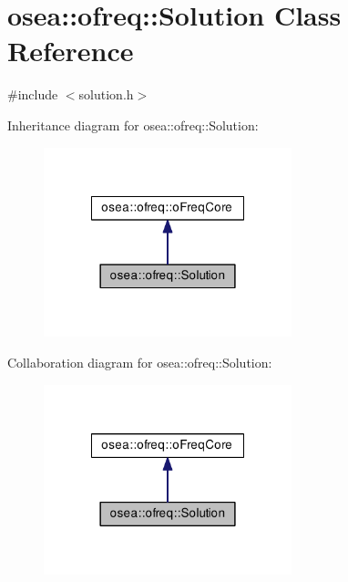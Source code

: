 \hypertarget{classosea_1_1ofreq_1_1_solution}{\section{osea\-:\-:ofreq\-:\-:Solution Class Reference}
\label{classosea_1_1ofreq_1_1_solution}
}


{\ttfamily \#include $<$solution.\-h$>$}



Inheritance diagram for osea\-:\-:ofreq\-:\-:Solution\-:
\nopagebreak
\begin{figure}[H]
\begin{center}
\leavevmode
\includegraphics[width=204pt]{classosea_1_1ofreq_1_1_solution__inherit__graph}
\end{center}
\end{figure}


Collaboration diagram for osea\-:\-:ofreq\-:\-:Solution\-:
\nopagebreak
\begin{figure}[H]
\begin{center}
\leavevmode
\includegraphics[width=204pt]{classosea_1_1ofreq_1_1_solution__coll__graph}
\end{center}
\end{figure}
